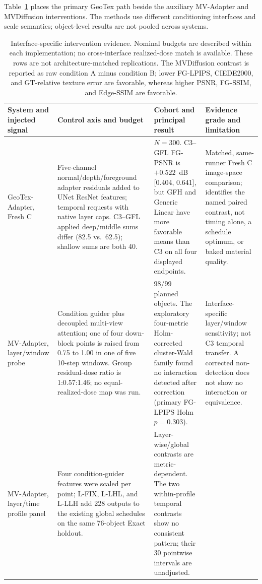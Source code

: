 \documentclass[times,twocolumn,final]{elsarticle}
\begin{document}
Table~\ref{tab:cross-interface} places the primary GeoTex path beside the auxiliary MV-Adapter and MVDiffusion interventions. The methods use different conditioning interfaces and scale semantics; object-level results are not pooled across systems.

\begin{table}[t]
\centering
\scriptsize
\setlength{\tabcolsep}{3pt}
\caption{Interface-specific intervention evidence. Nominal budgets are described within each implementation; no cross-interface realized-dose match is available. These rows are not architecture-matched replications. The MVDiffusion contrast is reported as raw condition A minus condition B; lower FG-LPIPS, CIEDE2000, and GT-relative texture error are favorable, whereas higher PSNR, FG-SSIM, and Edge-SSIM are favorable.}
\label{tab:cross-interface}
\begin{tabular}{p{2.4cm}p{4.0cm}p{4.2cm}p{4.5cm}}
\toprule
System and injected signal & Control axis and budget & Cohort and principal result & Evidence grade and limitation \\
\midrule
GeoTex-Adapter, Fresh C &
Five-channel normal/depth/foreground adapter residuals added to UNet ResNet features; temporal requests with native layer caps. C3--GFL applied deep/middle sums differ (82.5 vs.\ 62.5); shallow sums are both 40. &
$N=300$. C3--GFL FG-PSNR is $+0.522$~dB [0.404, 0.641], but GFH and Generic Linear have more favorable means than C3 on all four displayed endpoints. &
Matched, same-runner Fresh C image-space comparison; identifies the named paired contrast, not timing alone, a schedule optimum, or baked material quality. \\
MV-Adapter, layer/window probe &
Condition guider plus decoupled multi-view attention; one of four down-block points is raised from 0.75 to 1.00 in one of five 10-step windows. Group residual-dose ratio is 1:0.57:1.46; no equal-realized-dose map was run. &
98/99 planned objects. The exploratory four-metric Holm-corrected cluster-Wald family found no interaction detected after correction (primary FG-LPIPS Holm $p=0.303$). &
Interface-specific layer/window sensitivity; not C3 temporal transfer. A corrected non-detection does not show no interaction or equivalence. \\
MV-Adapter, layer/time profile panel &
Four condition-guider features were scaled per point; L-FIX, L-LHL, and L-LLH add 228 outputs to the existing global schedules on the same 76-object Exact holdout. &
Layer-wise/global contrasts are metric-dependent. The two within-profile temporal contrasts show no consistent pattern; their 30 pointwise intervals are unadjusted. &

\end{tabular}
\end{table}
\end{document}
